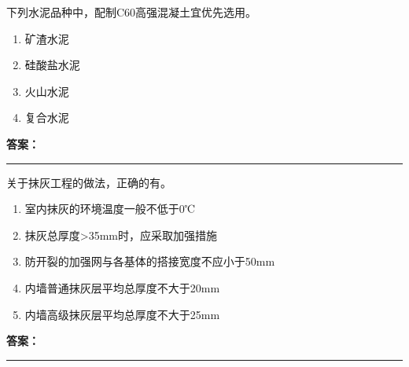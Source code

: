 \documentclass[UTF8,fontset=fandol,11pt]{ctexart}
\newcommand{\answerline}{\textcolor{answerred}{\rule{2.4cm}{0.7pt}}}
\begin{document}
\begin{quizbox}[title={乱序第 56 题｜第四章混凝土结构工程}]

下列水泥品种中，配制C60高强混凝土宜优先选用。\\

\begin{enumerate}[label=\Alph*.]

\item 矿渣水泥

\item 硅酸盐水泥

\item 火山水泥

\item 复合水泥

\end{enumerate}

\textbf{\textcolor{answerred}{答案：}} \answerline

\end{quizbox}

\vspace{0.2em}

\begin{quizbox}[title={乱序第 57 题｜第八章装饰工程（抹灰工程）}]

关于抹灰工程的做法，正确的有。\\

\begin{enumerate}[label=\Alph*.]

\item 室内抹灰的环境温度一般不低于0℃

\item 抹灰总厚度>35mm时，应采取加强措施

\item 防开裂的加强网与各基体的搭接宽度不应小于50mm

\item 内墙普通抹灰层平均总厚度不大于20mm

\item 内墙高级抹灰层平均总厚度不大于25mm

\end{enumerate}

\textbf{\textcolor{answerred}{答案：}} \answerline

\end{quizbox}

\vspace{0.2em}
\end{document}
